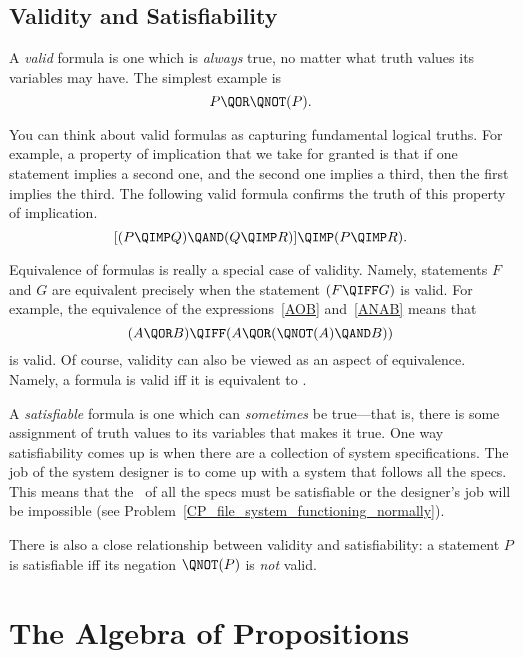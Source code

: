 \subsection{Validity and Satisfiability}
A \emph{valid}%
formula is one which is \emph{always} true, no matter
what truth values its variables may have.  The simplest example is
\[
P \QOR \QNOT(P).
\]

You can think about valid formulas as capturing fundamental logical
truths.  For example, a property of implication that we take for
granted is that if one statement implies a second one, and the second
one implies a third, then the first implies the third.  The following
valid formula confirms the truth of this property of implication.
\[
[(P \QIMP Q) \QAND (Q \QIMP R)] \QIMP (P \QIMP R).
\]

Equivalence of formulas is really a special case of validity.  Namely,
statements $F$ and $G$ are equivalent precisely when the statement $(F
\QIFF G)$ is valid.  For example, the equivalence of the
expressions~\eqref{AOB} and~\eqref{ANAB} means that
\[
(A \QOR B) \QIFF (A \QOR (\QNOT(A) \QAND B))
\]
is valid.  Of course, validity can also be viewed as an aspect of
equivalence.  Namely, a formula is valid iff it is equivalent
to \true.

A \emph{satisfiable}%
formula is one which can \emph{sometimes} be
true---that is, there is some assignment of truth values to its
variables that makes it true.  One way satisfiability comes up is when
there are a collection of system specifications.  The job of the
system designer is to come up with a system that follows all the
specs.  This means that the \QAND\ of all the specs must be
satisfiable or the designer's job will be impossible (see
Problem~\ref{CP_file_system_functioning_normally}).

There is also a close relationship between validity and
satisfiability: a statement $P$ is satisfiable iff its
negation $\QNOT(P)$ is \emph{not} valid.

\begin{problems}
\practiceproblems
{}

\classproblems
{}
\end{problems}


\section{The Algebra of Propositions}


